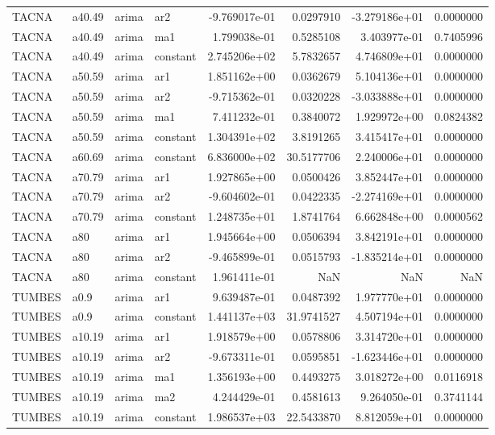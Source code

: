 \documentclass[
]{article}
\begin{document}
\begin{table}[!h]
\begin{tabular}[t]{llllrrrr}
\addlinespace
TACNA & a40.49 & arima & ar2 & -9.769017e-01 & 0.0297910 & -3.279186e+01 & 0.0000000\\
TACNA & a40.49 & arima & ma1 & 1.799038e-01 & 0.5285108 & 3.403977e-01 & 0.7405996\\
TACNA & a40.49 & arima & constant & 2.745206e+02 & 5.7832657 & 4.746809e+01 & 0.0000000\\
TACNA & a50.59 & arima & ar1 & 1.851162e+00 & 0.0362679 & 5.104136e+01 & 0.0000000\\
TACNA & a50.59 & arima & ar2 & -9.715362e-01 & 0.0320228 & -3.033888e+01 & 0.0000000\\
\addlinespace
TACNA & a50.59 & arima & ma1 & 7.411232e-01 & 0.3840072 & 1.929972e+00 & 0.0824382\\
TACNA & a50.59 & arima & constant & 1.304391e+02 & 3.8191265 & 3.415417e+01 & 0.0000000\\
TACNA & a60.69 & arima & constant & 6.836000e+02 & 30.5177706 & 2.240006e+01 & 0.0000000\\
TACNA & a70.79 & arima & ar1 & 1.927865e+00 & 0.0500426 & 3.852447e+01 & 0.0000000\\
TACNA & a70.79 & arima & ar2 & -9.604602e-01 & 0.0422335 & -2.274169e+01 & 0.0000000\\
\addlinespace
TACNA & a70.79 & arima & constant & 1.248735e+01 & 1.8741764 & 6.662848e+00 & 0.0000562\\
TACNA & a80 & arima & ar1 & 1.945664e+00 & 0.0506394 & 3.842191e+01 & 0.0000000\\
TACNA & a80 & arima & ar2 & -9.465899e-01 & 0.0515793 & -1.835214e+01 & 0.0000000\\
TACNA & a80 & arima & constant & 1.961411e-01 & NaN & NaN & NaN\\
TUMBES & a0.9 & arima & ar1 & 9.639487e-01 & 0.0487392 & 1.977770e+01 & 0.0000000\\
\addlinespace
TUMBES & a0.9 & arima & constant & 1.441137e+03 & 31.9741527 & 4.507194e+01 & 0.0000000\\
TUMBES & a10.19 & arima & ar1 & 1.918579e+00 & 0.0578806 & 3.314720e+01 & 0.0000000\\
TUMBES & a10.19 & arima & ar2 & -9.673311e-01 & 0.0595851 & -1.623446e+01 & 0.0000000\\
TUMBES & a10.19 & arima & ma1 & 1.356193e+00 & 0.4493275 & 3.018272e+00 & 0.0116918\\
TUMBES & a10.19 & arima & ma2 & 4.244429e-01 & 0.4581613 & 9.264050e-01 & 0.3741144\\
\addlinespace
TUMBES & a10.19 & arima & constant & 1.986537e+03 & 22.5433870 & 8.812059e+01 & 0.0000000\\

\end{tabular}
\end{table}
\end{document}
